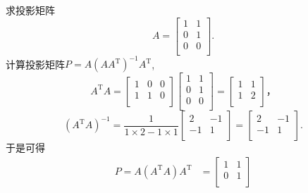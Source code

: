 
\begin{example}
    求投影矩阵
    \begin{equation}
      A = \begin{bmatrix}
       1 & 1\\
       0 & 1\\
       0 & 0\\
      \end{bmatrix}.
    \end{equation}
    计算投影矩阵$P = A \left( A A^{\mathrm{T}} \right) ^{-1}A^{\mathrm{T}}$,
    \begin{equation}
      A^{\mathrm{T}}A = \begin{bmatrix}
       1 & 0 & 0\\
       1 & 1 & 0\\
      \end{bmatrix}
      \begin{bmatrix}
       1 & 1\\
       0 & 1\\
       0 & 0\\
      \end{bmatrix}
      =
      \begin{bmatrix}
       1 & 1\\
       1 & 2\\
      \end{bmatrix}，
    \end{equation}
    \begin{equation}
      \left( A^{\mathrm{T}}A \right) ^{-1}  = \frac{1}{1\times 2-1\times 1} \begin{bmatrix}
       2 & -1\\
       -1 & 1\\
      \end{bmatrix}
      =
      \begin{bmatrix}
       2 & -1\\
       -1 & 1\\
      \end{bmatrix}.
    \end{equation}  
    于是可得
    \begin{equation}
        \begin{aligned}
            P = A \left( A^{\mathrm{T}}A \right) A^{\mathrm{T}} & = 
            \begin{bmatrix}
             1 & 1\\
             0 & 1\\

\end{bmatrix}
\end{aligned}
\end{equation}
\end{example}
